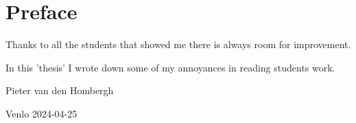 \chapter*{Preface}

Thanks to all the students that showed me there is always room for improvement.

In this 'thesis' I wrote down some of my annoyances in reading students work.


Pieter van den Hombergh

Venlo 2024-04-25
